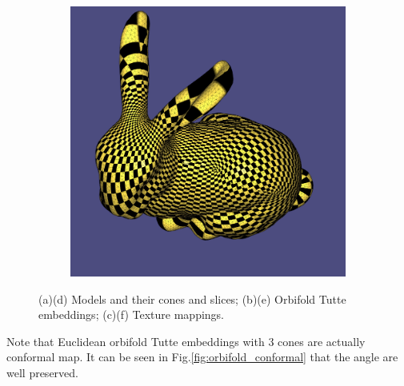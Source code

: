 \begin{figure}
\begin{subfigure}{0.3\textwidth}
\caption{}
\end{subfigure}
\begin{subfigure}{0.3\textwidth}
\includegraphics[height=\textwidth]{images/bunny_hyper_texture}
\caption{}
\end{subfigure}
\caption{(a)(d) Models and their cones and slices; (b)(e) Orbifold Tutte embeddings; (c)(f) Texture mappings.}
\label{fig:orbifold_results}
\end{figure}

Note that Euclidean orbifold Tutte embeddings with 3 cones are actually conformal map. It can be seen in Fig.\ref{fig:orbifold_conformal} that the angle are well preserved.



